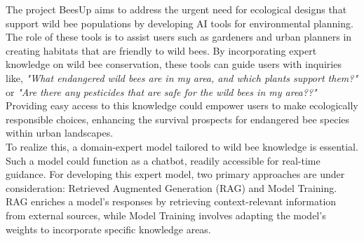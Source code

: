 \documentclass[11pt,a4paper, titlepage=false]{scrreprt}
\begin{document}



The project BeesUp aims to address the urgent need for ecological designs that support wild bee populations by developing AI tools for environmental planning. The role of these tools is to assist users such as gardeners and urban planners in creating habitats that are friendly to wild bees. By incorporating expert knowledge on wild bee conservation, these tools can guide users with inquiries like, \textit{"What endangered wild bees are in my area, and which plants support them?"} or \textit{"Are there any pesticides that are safe for the wild bees in my area??"} Providing easy access to this knowledge could empower users to make ecologically responsible choices, enhancing the survival prospects for endangered bee species within urban landscapes.\\

To realize this, a domain-expert model tailored to wild bee knowledge is essential. Such a model could function as a chatbot, readily accessible for real-time guidance. For developing this expert model, two primary approaches are under consideration: Retrieved Augmented Generation (RAG) and Model Training. RAG enriches a model’s responses by retrieving context-relevant information from external sources, while Model Training involves adapting the model’s weights to incorporate specific knowledge areas.\\
\end{document}
